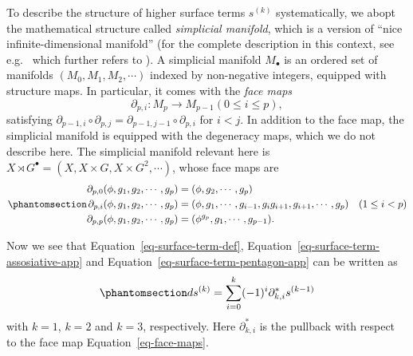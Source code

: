 \documentclass[
  letterpaper,
  DIV=11,
  numbers=noendperiod]{scrreport}
\begin{document}
To describe the structure of higher surface terms \(s^{(k)}\)
systematically, we abopt the mathematical structure called
\emph{simplicial manifold}, which is a version of ``nice
infinite-dimensional manifold'' (for the complete description in this
context, see e.g.~\autocite{kubel2018equivariant} which further refers
to \autocite{dupont1978curvature}). A simplicial manifold \(M_\bullet\)
is an ordered set of manifolds \((M_0,M_1,M_2,\cdots)\) indexed by
non-negative integers, equipped with structure maps. In particular, it
comes with the \emph{face maps} \[
\partial_{p,i} : M_p \to M_{p-1}  (0 \le i \le p ),
\] satisfying
\(\partial_{p-1,i} \circ \partial_{p,j} = \partial_{p-1,j-1} \circ \partial_{p,i}\)
for \(i<j\). In addition to the face map, the simplicial manifold is
equipped with the degeneracy maps, which we do not describe here. The
simplicial manifold relevant here is
\(X \rtimes G^\bullet = (X, X \times G, X \times G^2 , \cdots)\), whose
face maps are \begin{equation}\phantomsection\label{eq-face-maps}{
\begin{aligned}
\partial_{p,0} (\phi,g_1,g_2,\cdots,g_p) &= (\phi,g_2,\cdots,g_p)\\
\partial_{p,i} (\phi,g_1,g_2,\cdots,g_p) &= (\phi,g_1,\cdots,g_{i-1}, g_ig_{i+1}, g_{i+1},\cdots, g_p)\quad(1\le i < p)\\
\partial_{p,p} (\phi,g_1,g_2,\cdots,g_p) &= (\phi^{g_p},g_1,\cdots,g_{p-1}).
\end{aligned}
}\end{equation}

Now we see that Equation~\ref{eq-surface-term-def},
Equation~\ref{eq-surface-term-assosiative-app} and
Equation~\ref{eq-surface-term-pentagon-app} can be written as
\begin{equation}\phantomsection\label{eq-simplicial-closed-form}{
ds^{(k)} = \sum_{i=0}^{k} (-1)^{i} \partial_{k,i}^* s^{(k-1)}
}\end{equation} with \(k=1\), \(k=2\) and \(k=3\), respectively. Here
\(\partial_{k,i}^*\) is the pullback with respect to the face map
Equation~\ref{eq-face-maps}.
\end{document}
